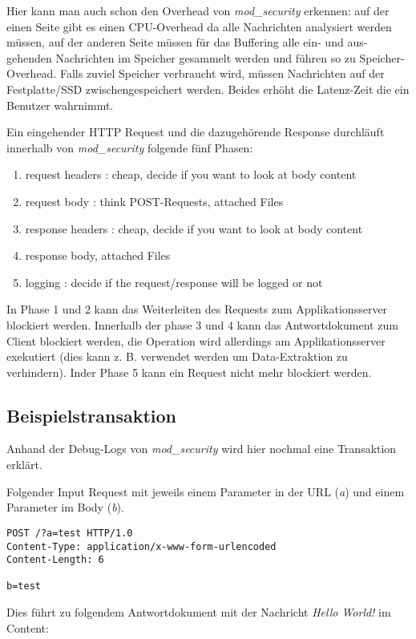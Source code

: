 Hier kann man auch schon den Overhead von \textit{mod\_security} erkennen: auf der einen Seite gibt es einen CPU-Overhead da alle Nachrichten analysiert werden müssen, auf der anderen Seite müssen für das Buffering alle ein- und aus-gehenden Nachrichten im Speicher gesammelt werden und führen so zu Speicher-Overhead. Falls zuviel Speicher verbraucht wird, müssen Nachrichten auf der Festplatte/SSD zwischengespeichert werden. Beides erhöht die Latenz-Zeit die ein Benutzer wahrnimmt.

Ein eingehender HTTP Request und die dazugehörende Response durchläuft innerhalb von \textit{mod\_security} folgende fünf Phasen:

\begin{enumerate}
	\item request headers : cheap, decide if you want to look at body content
	\item request body : think POST-Requests, attached Files
	\item response headers : cheap, decide if you want to look at body content
	\item response body, attached Files
	\item logging : decide if the request/response will be logged or not
\end{enumerate}

In Phase 1 und 2 kann das Weiterleiten des Requests zum Applikationsserver blockiert werden. Innerhalb der phase 3 und 4 kann das Antwortdokument zum Client blockiert werden, die Operation wird allerdings am Applikationsserver exekutiert (dies kann z. B. verwendet werden um Data-Extraktion zu verhindern). Inder Phase 5 kann ein Request nicht mehr blockiert werden.

\subsection{Beispielstransaktion}

Anhand der Debug-Logs von \textit{mod\_security} wird hier nochmal eine Transaktion erklärt.

Folgender Input Request mit jeweils einem Parameter in der URL (\textit{a}) und einem Parameter im Body (\textit{b}).

\begin{verbatim}
POST /?a=test HTTP/1.0
Content-Type: application/x-www-form-urlencoded
Content-Length: 6

b=test
\end{verbatim}

Dies führt zu folgendem Antwortdokument mit der Nachricht \textit{Hello World!} im Content:

